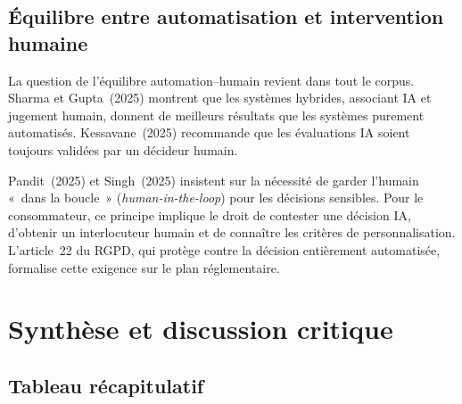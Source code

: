 \documentclass[12pt,a4paper]{article}
\begin{document}
\subsection{Équilibre entre automatisation et intervention humaine}

La question de l'équilibre automation--humain revient dans tout le corpus. Sharma et
Gupta~(2025) montrent que les systèmes hybrides, associant IA et jugement humain,
donnent de meilleurs résultats que les systèmes purement automatisés. Kessavane~(2025)
recommande que les évaluations IA soient toujours validées par un décideur humain.

Pandit~(2025) et Singh~(2025) insistent sur la nécessité de garder l'humain «~dans la
boucle~» (\emph{human-in-the-loop}) pour les décisions sensibles. Pour le consommateur,
ce principe implique le droit de contester une décision IA, d'obtenir un interlocuteur
humain et de connaître les critères de personnalisation. L'article~22 du RGPD, qui protège
contre la décision entièrement automatisée, formalise cette exigence sur le plan réglementaire.

\section{Synthèse et discussion critique}

\subsection{Tableau récapitulatif}
\end{document}
